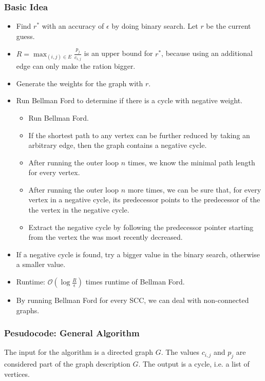 \documentclass[12pt]{article}
\begin{document}
\subsubsection*{Basic Idea}
\begin{itemize}
	\item Find $r^*$ with an accuracy of $\epsilon$ by doing binary search. Let $r$ be the current guess.
	\item $R = \max_{(i, j) \in E} \frac{p_j}{c_{i,j}}$ is an upper bound for $r^*$, because using an additional edge can only make the ration bigger.
	\item Generate the weights for the graph with $r$.
	\item Run Bellman Ford to determine if there is a cycle with negative weight.
		\begin{itemize}
			\item Run Bellman Ford.
			\item If the shortest path to any vertex can be further reduced by taking an arbitrary edge, then the graph contains a negative cycle.
			\item After running the outer loop $n$ times, we know the minimal path length for every vertex.
			\item After running the outer loop $n$ more times, we can be sure that, for every vertex in a negative cycle, its predecessor points to the predecessor of the the vertex in the negative cycle.
			\item Extract the negative cycle by following the predecessor pointer starting from the vertex the was most recently decreased.
		\end{itemize}
	\item If a negative cycle is found, try a bigger value in the binary search, otherwise a smaller value.
	\item Runtime: $\mathcal{O}(\log{\frac{R}{\epsilon}})$ times runtime of Bellman Ford.
	\item By running Bellman Ford for every SCC, we can deal with non-connected graphs.
\end{itemize}

\subsubsection*{Pesudocode: General Algorithm}
The input for the algorithm is a directed graph $G$. The values $c_{i,j}$ and $p_j$ are considered part of the graph description $G$. The output is a cycle, i.e. a list of vertices.
\end{document}
